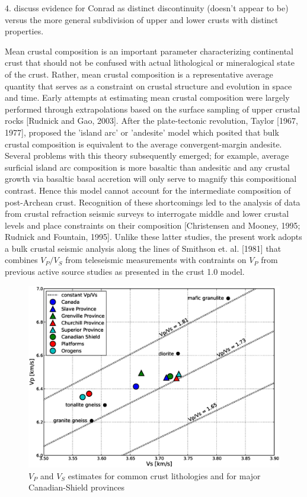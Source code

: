 \documentclass[draft, 12pt]{article}
\begin{document}
4. discuss evidence for Conrad as distinct discontinuity (doesn't appear to be) versus the more
general subdivision of upper and lower crusts with distinct properties.






Mean crustal composition is an important parameter characterizing continental crust that should not be confused with actual lithological or mineralogical state of the crust. Rather, mean crustal composition is a representative average quantity that serves as a constraint on crustal structure and evolution in space and time. Early attempts at estimating mean crustal composition were largely performed through extrapolations based on the surface sampling of upper crustal rocks [Rudnick and Gao, 2003]. After the plate-tectonic revolution, Taylor [1967, 1977], proposed the 'island arc' or 'andesite' model which posited that bulk crustal composition is equivalent to the average convergent-margin andesite. Several problems with this theory subsequently emerged; for example, average surficial island arc composition is more basaltic than andesitic and any crustal growth via basaltic basal accretion will only serve to magnify this compositional contrast. Hence this model cannot account for the intermediate composition of post-Archean crust. Recognition of these shortcomings led to the analysis of data from crustal refraction seismic surveys to interrogate middle and lower crustal levels and place constraints on their composition [Christensen and Mooney, 1995; Rudnick and Fountain, 1995]. Unlike these latter studies, the present work adopts a bulk crustal seismic analysis along the lines of Smithson et. al. [1981] that combines $V_P/V_S$ from teleseismic measurements with contraints on $V_P$ from previous active source studies as presented in the crust 1.0 model.

\begin{figure}
  \centering
  \includegraphics[width=\textwidth]{lithology}
  \caption{$V_P$ and $V_S$ estimates for common crust lithologies and for major Canadian-Shield provinces}
  \label{fig:lith}
\end{figure}
\end{document}
